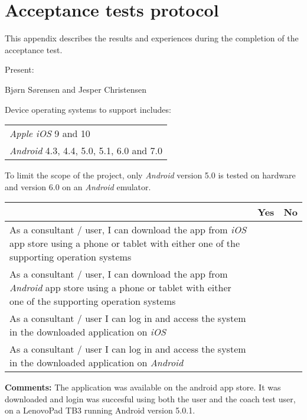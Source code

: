 \chapter{Acceptance tests protocol}
\label{ch:protocol}
This appendix describes the results and experiences during the completion of the acceptance test.

Present: 

Bjørn Sørensen and Jesper Christensen


Device operating systems to support includes: \newline
\begin{tabularx}{\textwidth}{X}
    \textit{Apple iOS} 9 and 10 \\
    \textit{Android} 4.3, 4.4, 5.0, 5.1, 6.0 and 7.0
\end{tabularx}

To limit the scope of the project, only \textit{Android} version 5.0 is tested on hardware and version 6.0 on an \textit{Android} emulator.

\begin{tabularx}{\textwidth}{|b|c|c|}
	\hline
	 & Yes & No \\
	\hline
	As a consultant / user, I can download the app from \textit{iOS} app store using a phone or tablet with either one of the supporting operation systems &   & \xmark  \\
	\hline
	As a consultant / user, I can download the app from \textit{Android} app store using a phone or tablet with either one of the supporting operation systems & \xmark  &  \\
	\hline
	As a consultant / user I can log in and access the system in the downloaded application on \textit{iOS} &  & \xmark \\
		\hline
	As a consultant / user I can log in and access the system in the downloaded application on \textit{Android} & \xmark  &  \\
	\hline
	\end{tabularx}
	
\vspace{3mm}
\textbf{Comments:}
The application was available on the android app store. It was downloaded and login was succesful using both the user and the coach test user, on a LenovoPad TB3 running Android version 5.0.1.
\vspace{3mm}


